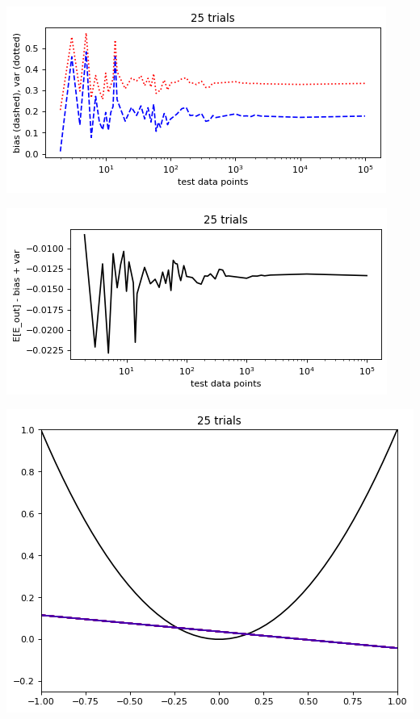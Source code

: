 \documentclass[12pt]{article}
\begin{document}
\pagebreak   
{}
        \begin{center}\includegraphics[width=0.6\linewidth]{png/25_trials_bias-var.png}\end{center}
        \begin{center}\includegraphics[width=0.6\linewidth]{png/25_trials_diff.png}\end{center}
        \begin{center}\includegraphics[width=0.58\linewidth]{png/25_trials.png}\end{center}
        
\end{document}
